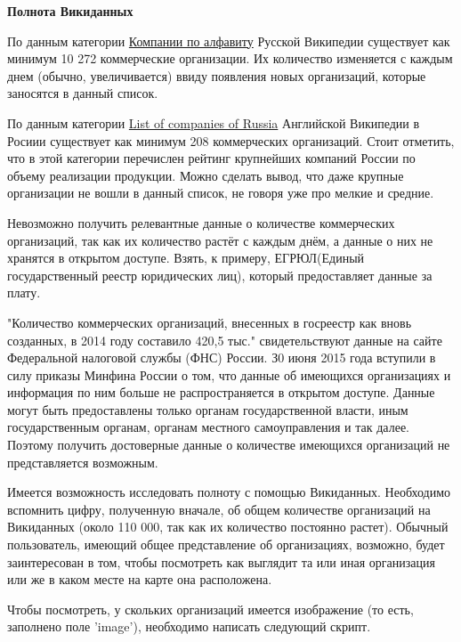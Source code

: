 \textbf{Полнота Викиданных}

По данным категории \href{https://ru.wikipedia.org/wiki/%D0%9A%D0%B0%D1%82%D0%B5%D0%B3%D0%BE%D1%80%D0%B8%D1%8F:%D0%9A%D0%BE%D0%BC%D0%BF%D0%B0%D0%BD%D0%B8%D0%B8_%D0%BF%D0%BE_%D0%B0%D0%BB%D1%84%D0%B0%D0%B2%D0%B8%D1%82%D1%83}{Компании по алфавиту} Русской Википедии существует как минимум 10 272 коммерческие организации. Их количество изменяется с каждым днем (обычно, увеличивается) ввиду появления новых организаций, которые заносятся в данный список.

По данным категории \href{https://en.wikipedia.org/wiki/List_of_companies_of_Russia}{List of companies of Russia} Английской Википедии в Росиии существует как минимум 208 коммерческих организаций. Стоит отметить, что в этой категории перечислен рейтинг крупнейших компаний России по объему реализации продукции. Можно сделать вывод, что даже крупные организации не вошли в данный список, не говоря уже про мелкие и средние.

Невозможно получить релевантные данные о количестве коммерческих организаций, так как их количество растёт с каждым днём, а данные о них не хранятся в открытом доступе. Взять, к примеру, ЕГРЮЛ(Единый государственный реестр юридических лиц), который предоставляет данные за плату. \cite{egrul}

"Количество коммерческих организаций, внесенных в госреестр как вновь созданных, в 2014 году составило 420,5 тыс."  свидетельствуют данные на сайте Федеральной налоговой службы (ФНС) России. З0 июня 2015 года вступили в силу приказы Минфина России о том, что данные об имеющихся организациях и информация по ним больше не распространяется в открытом доступе. Данные могут быть предоставлены только органам государственной власти, иным государственным органам, органам местного самоуправления и так далее. Поэтому получить достоверные данные о количестве имеющихся организаций не представляется возможным.

Имеется возможность исследовать полноту с помощью Викиданных. Необходимо вспомнить цифру, полученную вначале, об общем количестве организаций на Викиданных (около 110 000, так как их количество постоянно растет). Обычный пользователь, имеющий общее представление об организациях, возможно, будет заинтересован в том, чтобы посмотреть как выглядит та или иная организация или же в каком месте на карте она расположена.

Чтобы посмотреть, у скольких организаций имеется изображение (то есть, заполнено поле 'image'), необходимо написать следующий скрипт.

